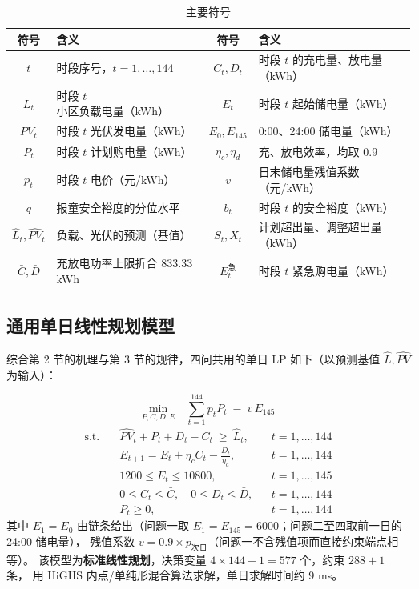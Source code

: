 \begin{table}[htbp]
\centering
\caption{主要符号}
\label{tab:symbols}
\small
\begin{tabular}{@{}clcl@{}}
\toprule
符号 & 含义 & 符号 & 含义 \\
\midrule
$t$ & 时段序号，$t=1,\dots,144$ & $C_t,D_t$ & 时段 $t$ 的充电量、放电量（kWh）\\
$L_t$ & 时段 $t$ 小区负载电量（kWh） & $E_t$ & 时段 $t$ 起始储电量（kWh）\\
$PV_t$ & 时段 $t$ 光伏发电量（kWh） & $E_0,E_{145}$ & 0:00、24:00 储电量（kWh）\\
$P_t$ & 时段 $t$ 计划购电量（kWh） & $\eta_c,\eta_d$ & 充、放电效率，均取 0.9\\
$p_t$ & 时段 $t$ 电价（元/kWh） & $v$ & 日末储电量残值系数（元/kWh）\\
$q$ & 报童安全裕度的分位水平 & $b_t$ & 时段 $t$ 的安全裕度（kWh）\\
$\hat L_t,\hat{PV}_t$ & 负载、光伏的预测（基值） & $S_t,X_t$ & 计划超出量、调整超出量（kWh）\\
$\bar C,\bar D$ & 充放电功率上限折合 833.33 kWh & $E_t^{\text{急}}$ & 时段 $t$ 紧急购电量（kWh）\\
\bottomrule
\end{tabular}
\end{table}

\subsection{通用单日线性规划模型}

综合第 2 节的机理与第 3 节的规律，四问共用的单日 LP 如下（以预测基值 $\hat L,\hat{PV}$ 为输入）：

\begin{equation}
\underset{P,C,D,E}{\text{min}}\quad \sum_{t=1}^{144} p_t P_t \;-\; v\,E_{145}
\label{eq:obj}
\end{equation}
\begin{align}
\text{s.t.}\quad & \hat{PV}_t + P_t + D_t - C_t \ \ge\ \hat L_t, && t=1,\dots,144 \label{eq:c1}\\
& E_{t+1} = E_t + \eta_c C_t - \frac{D_t}{\eta_d}, && t=1,\dots,144 \label{eq:c2}\\
& 1200 \le E_t \le 10800, && t=1,\dots,145 \label{eq:c3}\\
& 0 \le C_t \le \bar C,\quad 0 \le D_t \le \bar D, && t=1,\dots,144 \label{eq:c4}\\
& P_t \ge 0, && t=1,\dots,144 \label{eq:c5}
\end{align}
其中 $E_1=E_0$ 由链条给出（问题一取 $E_1=E_{145}=6000$；问题二至四取前一日的 24:00 储电量），
残值系数 $v=0.9\times\bar p_{\text{次日}}$（问题一不含残值项而直接约束端点相等）。
该模型为\textbf{标准线性规划}，决策变量 $4\times144+1=577$ 个，约束 $288+1$ 条，
用 HiGHS 内点/单纯形混合算法求解，单日求解时间约 9 ms。
